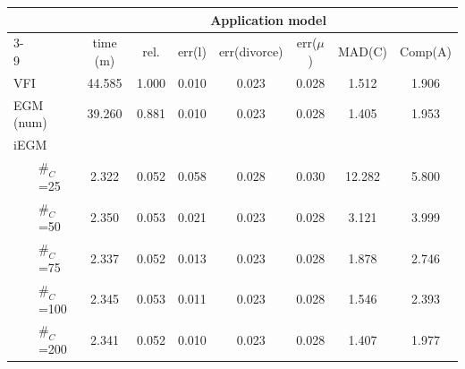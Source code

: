 \begin{tabular}{llccccccc} \toprule
&& \multicolumn{7}{c}{Application model}  \\ 
 \cmidrule(lr){3-9} && time (m) & rel. & err(l) & err(divorce) & err($\mu$) & MAD(C)  & Comp(A) \\ \midrule 
\multicolumn{2}{l}{VFI} & 44.585 & 1.000 & 0.010 & 0.023 & 0.028 & 1.512 & 1.906 \\ 
\multicolumn{2}{l}{EGM (num)} & 39.260 & 0.881 & 0.010 & 0.023 & 0.028 & 1.405 & 1.953 \\ 
\multicolumn{2}{l}{iEGM} & \multicolumn{7}{c}{} \\ 
& $\#_C$=25& 2.322 & 0.052 & 0.058 & 0.028 & 0.030 & 12.282 & 5.800 \\ 
& $\#_C$=50& 2.350 & 0.053 & 0.021 & 0.023 & 0.028 & 3.121 & 3.999 \\ 
& $\#_C$=75& 2.337 & 0.052 & 0.013 & 0.023 & 0.028 & 1.878 & 2.746 \\ 
& $\#_C$=100& 2.345 & 0.053 & 0.011 & 0.023 & 0.028 & 1.546 & 2.393 \\ 
& $\#_C$=200& 2.341 & 0.052 & 0.010 & 0.023 & 0.028 & 1.407 & 1.977 \\ 
\bottomrule \end{tabular}
